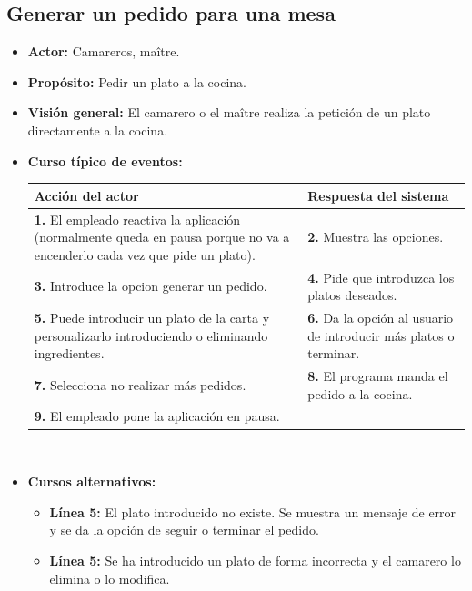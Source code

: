 \documentclass[spanish,a4paper,12pt]{report}	%
\begin{document}

		\subsection{Generar un pedido para una mesa}
			\begin{itemize}
			\item \textbf{Actor:} Camareros, maître.
			\item \textbf{Propósito: } Pedir un plato a la cocina.
			\item \textbf{Visión general:} El camarero o el maître realiza la petición de un plato directamente a la cocina.
			\item \textbf{Curso típico de eventos:} 	\\
				\begin{tabular}{|p{6cm}||p{6cm}|}
				\hline
				\textbf{Acción del actor} & \textbf{Respuesta del sistema} \\ \hline \hline
				\textbf{1.} El empleado reactiva la aplicación (normalmente queda en pausa porque no va a encenderlo cada vez que pide un plato). & \textbf{2.} Muestra las opciones.\\ \hline 
				\textbf{3.} Introduce la opcion generar un pedido. & \textbf{4.} Pide que introduzca los platos deseados. \\ \hline
				\textbf{5.} Puede introducir un plato de la carta y personalizarlo introduciendo o eliminando ingredientes. & \textbf{6.} Da la opción al usuario de introducir más platos o terminar. \\ \hline
				\textbf{7.} Selecciona no realizar más pedidos.	& \textbf{8.} El programa manda el pedido a la cocina. \\ \hline
				\textbf{9.} El empleado pone la aplicación en pausa. & \\ \hline
			\end{tabular}
			\\
			\item \textbf{Cursos alternativos:} 
			\begin{itemize}
			\item  \textbf{Línea 5:} El plato introducido no existe. Se muestra un mensaje de error y se da la opción de seguir o terminar el pedido.
			\item  \textbf{Línea 5:} Se ha introducido un plato de forma incorrecta y el camarero lo elimina o lo modifica.
			\end {itemize}
		\end {itemize}
		
\end{document}
